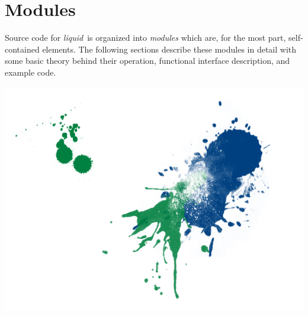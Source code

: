\documentclass[11pt,twoside]{article}
\newcommand{\liquid}{{\it liquid}}
\begin{document}
\vfill



%




%
%
\newpage
\part{Modules}
\label{part:modules}

\bigskip
\noindent
Source code for \liquid\ is organized into {\em modules} which are, for
the most part, self-contained elements.
The following sections describe these modules in detail
with some basic theory behind their operation,
functional interface description,
and example code.

\vfill

\includegraphics[width=\textwidth]{graphics/liquid_splatter_03.png}

\vfill




%


%









%


%



\end{document}
